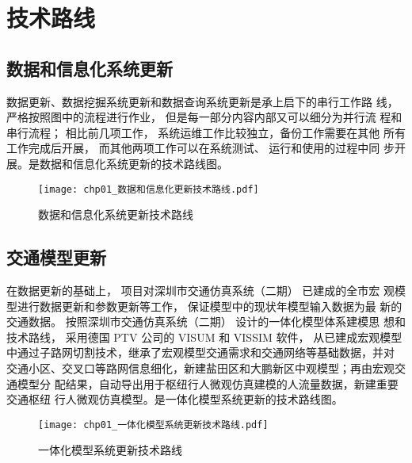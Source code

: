 \section{技术路线}
\subsection{数据和信息化系统更新}
数据更新、数据挖掘系统更新和数据查询系统更新是承上启下的串行工作路
线，严格按照图中的流程进行作业， 但是每一部分内容内部又可以细分为并行流
程和串行流程； 相比前几项工作， 系统运维工作比较独立，备份工作需要在其他
所有工作完成后开展， 而其他两项工作可以在系统测试、 运行和使用的过程中同
步开展。是数据和信息化系统更新的技术路线图。

\begin{figure}[ht]
  \centering
  \texttt{[image: chp01\_数据和信息化更新技术路线.pdf]}
  \caption{数据和信息化系统更新技术路线\label{fig:数据和信息化更新技术路线} }
\end{figure}

\subsection{交通模型更新}
在数据更新的基础上， 项目对深圳市交通仿真系统（二期） 已建成的全市宏
观模型进行数据更新和参数更新等工作， 保证模型中的现状年模型输入数据为最
新的交通数据。 按照深圳市交通仿真系统（二期） 设计的一体化模型体系建模思
想和技术路线， 采用德国 PTV 公司的 VISUM 和 VISSIM 软件， 从已建成宏观模型
中通过子路网切割技术，继承了宏观模型交通需求和交通网络等基础数据，并对
交通小区、交叉口等路网信息细化，新建盐田区和大鹏新区中观模型；再由宏观交通模型分
配结果，自动导出用于枢纽行人微观仿真建模的人流量数据，新建重要交通枢纽
行人微观仿真模型。是一体化模型系统更新的技术路线图。

\begin{figure}[ht]
  \centering
  \texttt{[image: chp01\_一体化模型系统更新技术路线.pdf]}
  \caption{一体化模型系统更新技术路线\label{fig:一体化模型系统更新技术路线} }
\end{figure}















